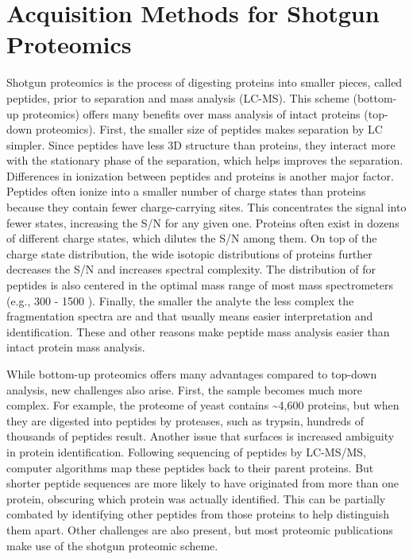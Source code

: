 \section{Acquisition Methods for Shotgun Proteomics}
Shotgun proteomics is the process of digesting proteins into smaller pieces, called peptides, prior to separation and mass analysis (LC-MS).  This scheme (bottom-up proteomics) offers many benefits over mass analysis of intact proteins (top-down proteomics). First, the smaller size of peptides makes separation by LC simpler. Since peptides have less 3D structure than proteins, they interact more with the stationary phase of the separation, which helps improves the separation. Differences in ionization between peptides and proteins is another major factor. Peptides often ionize into a smaller number of charge states than proteins because they contain fewer charge-carrying sites. This concentrates the signal into fewer states, increasing the S/N for any given one. Proteins often exist in dozens of different charge states, which dilutes the S/N among them. On top of the charge state distribution, the wide isotopic distributions of proteins further decreases the S/N and increases spectral complexity. The distribution of \mz{} for peptides is also centered in the optimal mass range of most mass spectrometers (e.g., 300 - 1500 \mz{}). Finally, the smaller the analyte the less complex the fragmentation spectra are and that usually means easier interpretation and identification. These and other reasons make peptide mass analysis easier than intact protein mass analysis.

While bottom-up proteomics offers many advantages compared to top-down analysis, new challenges also arise. First, the sample becomes much more complex. For example, the proteome of yeast contains \textasciitilde4,600 proteins, but when they are digested into peptides by proteases, such as trypsin, hundreds of thousands of peptides result. Another issue that surfaces is increased ambiguity in protein identification. Following sequencing of peptides by LC-MS/MS, computer algorithms map these peptides back to their parent proteins. But shorter peptide sequences are more likely to have originated from more than one protein, obscuring which protein was actually identified. This can be partially combated by identifying other peptides from those proteins to help distinguish them apart. Other challenges are also present, but most proteomic publications make use of the shotgun proteomic scheme.

